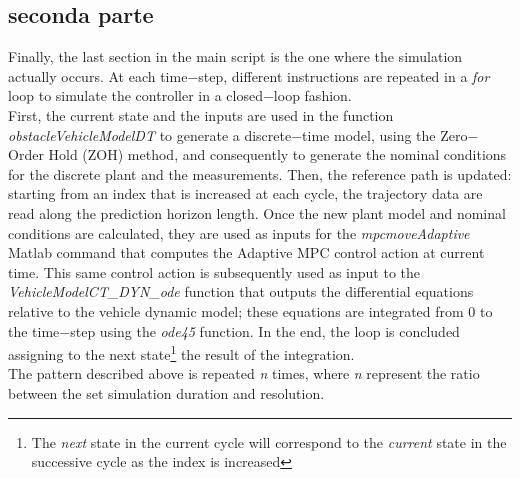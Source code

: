 \subsection{seconda parte} %
Finally, the last section in the main script is the one where the simulation actually occurs. At each time$-$step, different instructions are repeated in a \textit{for} loop to simulate the controller in a closed$-$loop fashion.\\
First, the current state and the inputs are used in the function \textit{obstacleVehicleModelDT} to generate a discrete$-$time model, using the Zero$-$Order Hold (ZOH) method, and consequently to generate the nominal conditions for the discrete plant and the measurements. Then, the reference path is updated: starting from an index that is increased at each cycle, the trajectory data are read along the prediction horizon length. Once the new plant model and nominal conditions are calculated, they are used as inputs for the \textit{mpcmoveAdaptive} Matlab command that computes the Adaptive MPC control action at current time. This same control action is subsequently used as input to the \textit{VehicleModelCT\_DYN\_ode} function that outputs the differential equations relative to the vehicle dynamic model; these equations are integrated from 0 to the time$-$step using the \textit{ode45} function. In the end, the loop is concluded assigning to the next state\footnote{The \textit{next} state in the current cycle will correspond to the \textit{current} state in the successive cycle as the index is increased} the result of the integration.\\
The pattern described above is repeated \textit{n} times, where \textit{n} represent the ratio between the set simulation duration and resolution.